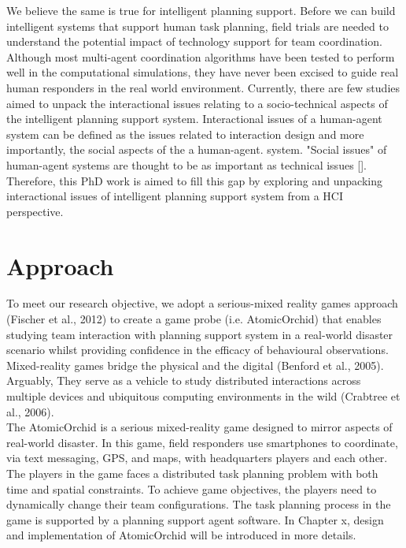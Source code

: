 We believe the same is true for intelligent planning support. Before we can build intelligent systems that support human task planning, field trials are needed to understand the potential impact of technology support for team coordination. Although most multi-agent coordination algorithms have been tested to perform well in the computational simulations, they have never been excised to guide real human responders in the real world environment. Currently, there are few studies aimed to unpack the interactional issues relating to a socio-technical aspects of the intelligent planning support system. Interactional issues of a human-agent system can be defined as the issues related to interaction design and more importantly, the social aspects of the a human-agent. system. "Social issues" of human-agent systems are thought to be as important as technical issues []. Therefore, this PhD work is aimed to fill this gap by exploring and unpacking interactional issues of intelligent planning support system from a HCI perspective.\\

\section{Approach}\label{sec:custom}

To meet our research objective, we adopt a serious-mixed reality games approach (Fischer et al., 2012) to create a game probe (i.e. AtomicOrchid) that enables studying team interaction with planning support system in a real-world disaster scenario whilst providing confidence in the efficacy of behavioural observations. Mixed-reality games bridge the physical and the digital (Benford et al., 2005). Arguably, They serve as a vehicle to study distributed interactions across multiple devices and ubiquitous computing environments in the wild (Crabtree et al., 2006).\\

The AtomicOrchid is a serious mixed-reality game designed to mirror aspects of real-world disaster. In this game, field responders use smartphones to coordinate, via text messaging, GPS, and maps, with headquarters players and each other. The players in the game faces a distributed task planning problem with both time and spatial constraints. To achieve game objectives, the players need to dynamically change their team configurations. The task planning process in the game is supported by a planning support agent software. In Chapter x, design and implementation of AtomicOrchid will be introduced in more details.\\

